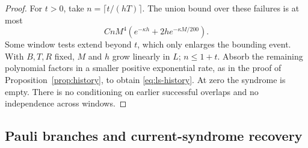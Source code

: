 \begin{proof}
For \(t>0\), take \(n=\lceil t/(hT)\rceil\).
The union bound over these failures is at most
\[
 CnM^4\left(e^{-\kappa h}
                    +2h e^{-\kappa M/200}\right).
\]
Some window tests extend beyond \(t\), which only
enlarges the bounding event. With \(B,T,R\) fixed,
\(M\) and \(h\) grow linearly in \(L\);
\(n\le1+t\). Absorb the remaining polynomial factors
in a smaller positive exponential rate, as in the
proof of Proposition~\ref{prop:history}, to obtain
\eqref{eq:ls-history}. At zero the syndrome is empty.
There is no conditioning on earlier successful
overlaps and no independence across windows.
\end{proof}

\subsection{Pauli branches and current-syndrome recovery}

